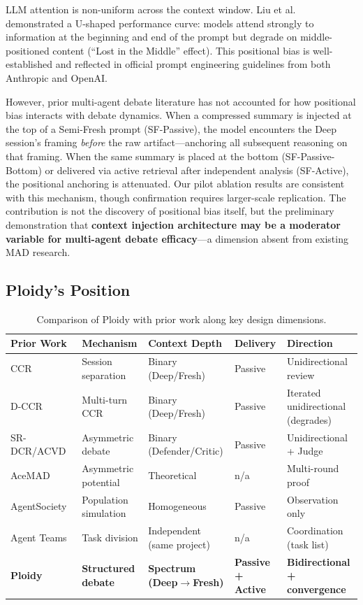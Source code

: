 \documentclass[11pt]{article}
\begin{document}
LLM attention is non-uniform across the context window. Liu et al.~\citep{liu2023lost} demonstrated a U-shaped performance curve: models attend strongly to information at the beginning and end of the prompt but degrade on middle-positioned content (``Lost in the Middle'' effect). This positional bias is well-established and reflected in official prompt engineering guidelines from both Anthropic and OpenAI.

However, prior multi-agent debate literature has not accounted for how positional bias interacts with debate dynamics. When a compressed summary is injected at the top of a Semi-Fresh prompt (SF-Passive), the model encounters the Deep session's framing \emph{before} the raw artifact---anchoring all subsequent reasoning on that framing. When the same summary is placed at the bottom (SF-Passive-Bottom) or delivered via active retrieval after independent analysis (SF-Active), the positional anchoring is attenuated. Our pilot ablation results are consistent with this mechanism, though confirmation requires larger-scale replication. The contribution is not the discovery of positional bias itself, but the preliminary demonstration that \textbf{context injection architecture may be a moderator variable for multi-agent debate efficacy}---a dimension absent from existing MAD research.

\subsection{Ploidy's Position}
\label{sec:position}

\begin{table}[t]
\centering
\caption{Comparison of Ploidy with prior work along key design dimensions.}
\label{tab:prior-work}
\footnotesize
\setlength{\tabcolsep}{4pt}
\begin{tabular}{@{}p{3.2cm}p{2.4cm}p{3cm}p{2.2cm}p{3cm}@{}}
\toprule
\textbf{Prior Work} & \textbf{Mechanism} & \textbf{Context Depth} & \textbf{Delivery} & \textbf{Direction} \\
\midrule
CCR~\citep{song2026ccr} & Session separation & Binary (Deep/Fresh) & Passive & Unidirectional review \\[3pt]
D-CCR~\citep{song2026dccr} & Multi-turn CCR & Binary (Deep/Fresh) & Passive & Iterated unidirectional (degrades) \\[3pt]
SR-DCR/ACVD~\citep{srdcr2025} & Asymmetric debate & Binary (Defender/Critic) & Passive & Unidirectional + Judge \\[3pt]
AceMAD~\citep{liu2026acemad} & Asymmetric potential & Theoretical & n/a & Multi-round proof \\[3pt]
AgentSociety~\citep{pang2025agentsociety} & Population simulation & Homogeneous & Passive & Observation only \\[3pt]
Agent Teams~\citep{anthropic2026agentteams} & Task division & Independent (same project) & n/a & Coordination (task list) \\[3pt]
\textbf{Ploidy} & \textbf{Structured debate} & \textbf{Spectrum (Deep$\to$Fresh)} & \textbf{Passive + Active} & \textbf{Bidirectional + convergence} \\
\bottomrule
\end{tabular}
\end{table}
\end{document}

